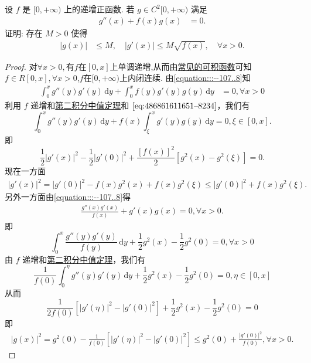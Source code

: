 \documentclass[../../main.tex]{subfiles}%
\begin{document}
\begin{example}
设 \( f \) 是 \( [0,+\infty) \) 上的递增正函数. 若 \( g \in C^2[0,+\infty) \) 满足
\begin{align}
g''(x) + f(x)g(x) &= 0.\label{equation:::--107..8}
\end{align}
证明: 存在 \( M > 0 \) 使得
\begin{align}
|g(x)| &\leqslant M, \quad |g'(x)| \leqslant M\sqrt{f(x)}, \quad \forall x > 0.\label{equation:::--107..9}
\end{align}
\end{example}
\begin{proof}

对$\forall x>0,$有$f$在$[0,x]$上单调递增,从而由\hyperref[proposition:常见的可积函数]{常见的可积函数}可知$f\in R[0,x],\forall x>0$,$f$在$[0,+\infty)$上内闭连续.
由\eqref{equation:::--107..8}知
\begin{align}
\int_0^x g''(y)g'(y)\,\mathrm{d}y + \int_0^x f(y)g'(y)g(y)\,\mathrm{d}y &= 0, \forall x > 0 \label{eq:486861611651--8234}
\end{align}
利用 \( f \) 递增和\hyperref[theorem:积分中值定理(2)]{第二积分中值定理}和 \(\eqref{eq:486861611651--8234}\)，我们有
\[
\int_0^x g''(y)g'(y)\,\mathrm{d}y + f(x)\int_\xi^x g'(y)g(y)\,\mathrm{d}y = 0, \xi \in [0, x].
\]
即
\[
\frac{1}{2}\lvert g'(x)\rvert^2 - \frac{1}{2}\lvert g'(0)\rvert^2 + \frac{[f(x)]^2}{2}\left[g^2(x) - g^2(\xi)\right] = 0.
\]
现在一方面
\begin{align}
\lvert g'(x)\rvert^2 = \lvert g'(0)\rvert^2 - f(x)g^2(x) + f(x)g^2(\xi) \leqslant \lvert g'(0)\rvert^2 + f(x)g^2(\xi).\label{eq:::--123124523-1214} 
\end{align}
另外一方面由\eqref{equation:::--107..8}得
\begin{align*}
\frac{g''(x)g'(x)}{f(x)} + g'(x)g(x) = 0, \forall x > 0. 
\end{align*}
即
\[
\int_0^x \frac{g''(y)g'(y)}{f(y)}\,\mathrm{d}y + \frac{1}{2}g^2(x) - \frac{1}{2}g^2(0) = 0, \forall x > 0
\]
由 \( f \) 递增和\hyperref[theorem:积分中值定理(1)]{第二积分中值定理}，我们有
\[
\frac{1}{f(0)}\int_0^\eta g''(y)g'(y)\,\mathrm{d}y + \frac{1}{2}g^2(x) - \frac{1}{2}g^2(0) = 0, \eta \in [0, x]
\]
从而
\[
\frac{1}{2f(0)}\left[\lvert g'(\eta)\rvert^2 - \lvert g'(0)\rvert^2\right] + \frac{1}{2}g^2(x) - \frac{1}{2}g^2(0) = 0
\]
即
\begin{align}
\lvert g(x)\rvert^2 = g^2(0) - \frac{1}{f(0)}\left[\lvert g'(\eta)\rvert^2 - \lvert g'(0)\rvert^2\right] \leqslant g^2(0) + \frac{\lvert g'(0)\rvert^2}{f(0)},\forall x>0.\label{eq:::--123124523-1211}

\end{align}
\end{proof}
\end{document}
